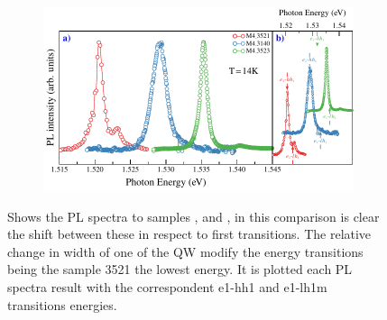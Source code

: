 \begin{figure}[h!]
	\centering
	\begin{subfigure}{\textwidth}
		\includegraphics[width=\textwidth]{../figures/chapter-3/pl-plots/build/pl-2}
		\label{subfig:chapter-3-PL-experiments-M4_3140-M4_3521-M4_3523-a)}
		\label{subfig:chapter-3-PL-experiments-M4_3140-M4_3521-M4_3523-b)}
	\end{subfigure}
	\caption{ Shows the PL spectra to samples ,  and , in this comparison is clear the shift  between these in respect to first transitions. The relative change in width of one of the QW modify the  energy transitions being the sample 3521 the lowest energy.  It is plotted  each PL spectra result with the correspondent e1-hh1 and e1-lh1m transitions energies. }
	\label{fig:chapter-3-PL-experiments-M4_3140-M4_3521-M4_3523}
\end{figure}
